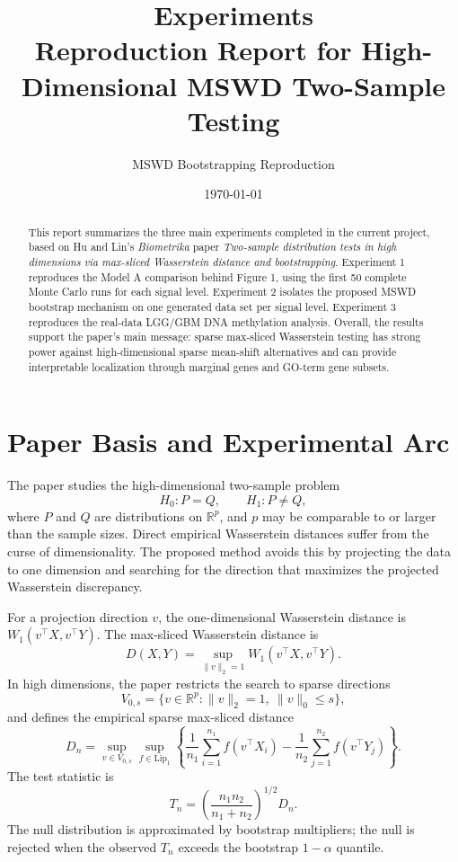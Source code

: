 \documentclass[a4paper,11pt]{article}
\title{\textbf{Experiments}\\Reproduction Report for High-Dimensional MSWD Two-Sample Testing}
\author{MSWD Bootstrapping Reproduction}
\date{\today}
\begin{document}
\maketitle

\begin{abstract}
This report summarizes the three main experiments completed in the current project, based on Hu and Lin's \textit{Biometrika} paper \textit{Two-sample distribution tests in high dimensions via max-sliced Wasserstein distance and bootstrapping}. Experiment 1 reproduces the Model A comparison behind Figure 1, using the first 50 complete Monte Carlo runs for each signal level. Experiment 2 isolates the proposed MSWD bootstrap mechanism on one generated data set per signal level. Experiment 3 reproduces the real-data LGG/GBM DNA methylation analysis. Overall, the results support the paper's main message: sparse max-sliced Wasserstein testing has strong power against high-dimensional sparse mean-shift alternatives and can provide interpretable localization through marginal genes and GO-term gene subsets.
\end{abstract}

\section{Paper Basis and Experimental Arc}

The paper studies the high-dimensional two-sample problem
\[
H_0:P=Q,\qquad H_1:P\neq Q,
\]
where \(P\) and \(Q\) are distributions on \(\mathbb{R}^p\), and \(p\) may be comparable to or larger than the sample sizes. Direct empirical Wasserstein distances suffer from the curse of dimensionality. The proposed method avoids this by projecting the data to one dimension and searching for the direction that maximizes the projected Wasserstein discrepancy.

For a projection direction \(v\), the one-dimensional Wasserstein distance is \(W_1(v^\top X,v^\top Y)\). The max-sliced Wasserstein distance is
\[
D(X,Y)=\sup_{\|v\|_2=1} W_1(v^\top X,v^\top Y).
\]
In high dimensions, the paper restricts the search to sparse directions
\[
V_{0,s}=\{v\in\mathbb{R}^p:\|v\|_2=1,\ \|v\|_0\le s\},
\]
and defines the empirical sparse max-sliced distance
\[
D_n=\sup_{v\in V_{0,s}}\sup_{f\in \mathrm{Lip}_1}
\left\{\frac{1}{n_1}\sum_{i=1}^{n_1}f(v^\top X_i)
-\frac{1}{n_2}\sum_{j=1}^{n_2}f(v^\top Y_j)\right\}.
\]
The test statistic is
\[
T_n=\left(\frac{n_1n_2}{n_1+n_2}\right)^{1/2}D_n.
\]
The null distribution is approximated by bootstrap multipliers; the null is rejected when the observed \(T_n\) exceeds the bootstrap \(1-\alpha\) quantile.
\end{document}
